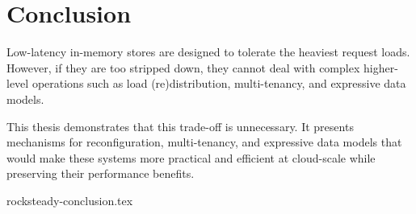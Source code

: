 \chapter{Conclusion}

Low-latency in-memory stores are designed to tolerate the heaviest request
loads. However, if they are too stripped down, they cannot deal with complex
higher-level operations such as load (re)distribution,
multi-tenancy, and expressive data models.

This thesis demonstrates that this trade-off is unnecessary.
It presents mechanisms for
reconfiguration, multi-tenancy, and expressive data
models that
would make these systems more practical and
efficient at cloud-scale while preserving their performance
benefits.

 {rocksteady-conclusion.tex}

